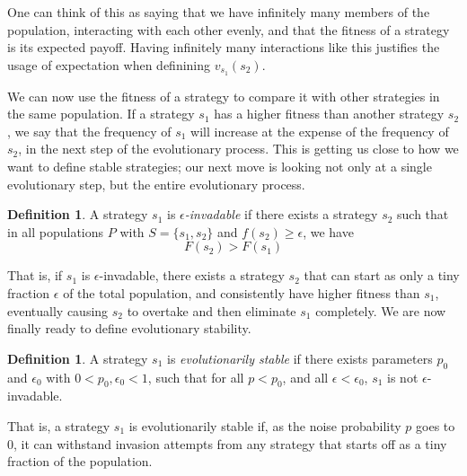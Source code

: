 \documentclass[11pt]{amsart}
\theoremstyle{definition}
\newtheorem{definition}[theorem]{Definition}
\theoremstyle{remark}
\begin{document}
One can think of this as saying that we have infinitely many members of the population, interacting with each other evenly, and that the fitness of a strategy is its expected payoff. Having infinitely many interactions like this justifies the usage of expectation when definining $v_{s_1}(s_2)$.

We can now use the fitness of a strategy to compare it with other strategies in the same population. If a strategy $s_1$ has a higher fitness than another strategy $s_2$, we say that the frequency of $s_1$ will increase at the expense of the frequency of $s_2$, in the next step of the evolutionary process. This is getting us close to how we want to define stable strategies; our next move is looking not only at a single evolutionary step, but the entire evolutionary process.

\begin{definition}
  A strategy $s_1$ is \textit{$\epsilon$-invadable} if there exists a strategy $s_2$ such that in all populations $P$ with $S = \{s_1,s_2\}$ and $f(s_2) \geq \epsilon$, we have 
  \begin{equation*}
    \label{fitnesscond}
    F(s_2) > F(s_1)
  \end{equation*}
\end{definition}

That is, if $s_1$ is $\epsilon$-invadable, there exists a strategy $s_2$ that can start as only a tiny fraction $\epsilon$ of the total population, and consistently have higher fitness than $s_1$, eventually causing $s_2$ to overtake and then eliminate $s_1$ completely. We are now finally ready to define evolutionary stability.

\begin{definition}
  \label{definitionevolutionarystability}
  A strategy $s_1$ is \textit{evolutionarily stable} if there exists parameters $p_0$ and $\epsilon_0$ with $0 < p_0, \epsilon_0 < 1$, such that for all $p < p_0$, and all $\epsilon < \epsilon_0$, $s_1$ is not $\epsilon$-invadable.
\end{definition}


That is, a strategy $s_1$ is evolutionarily stable if, as the noise probability $p$ goes to 0, it can withstand invasion attempts from any strategy that starts off as a tiny fraction of the population.
\end{document}
